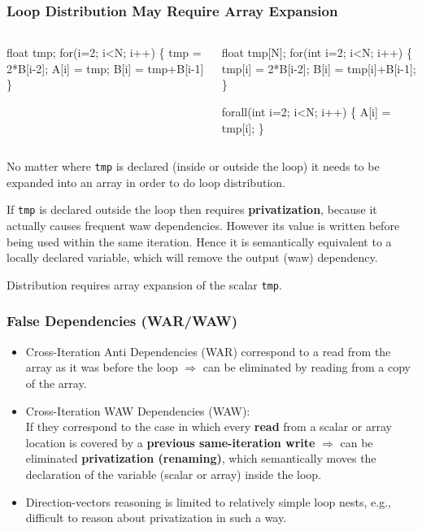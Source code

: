 \documentclass{beamer}
\renewcommand{\emph}[1]{\textcolor{structure}{#1}}
\newcommand{\emp}[1]{\textcolor{DikuRed}{ #1}}
\begin{document}
\begin{frame}[fragile,t]
  \frametitle{Loop Distribution May Require Array Expansion} 


\begin{columns}
\begin{colorcode}[fontsize=\scriptsize]
  float tmp;
  for(i=2; i<N; i++) \{
    \emp{tmp} = 2*B[i-2]; 
    A[i] = tmp;
    B[i] = tmp+B[i-1]
  \}
\end{colorcode}
\begin{colorcode}[fontsize=\scriptsize]
  \emph{float tmp[N]};
  for(int i=2; i<N; i++) \{
    tmp[i] = 2*B[i-2]; 
    B[i] = tmp[i]+B[i-1];
  \}

  \emph{forall(int i=2; i<N; i++)} \{
    A[i] = tmp[i];
  \}
\end{colorcode}
\end{columns}
\bigskip

No matter where {\tt tmp} is declared (inside or outside
the loop) it needs to be expanded into an array in order
to do loop distribution.\bigskip

If {\tt tmp} is declared outside the loop then requires \emp{\bf privatization}, \pause
because it actually causes frequent {\sc waw} dependencies.
However its value is written before being used within the same iteration.
Hence it is semantically equivalent to a locally declared variable,
which will remove the output ({\sc waw}) dependency.\bigskip

Distribution requires array expansion of the scalar {\tt tmp}.

\end{frame}


\begin{frame}[fragile,t]
  \frametitle{False Dependencies (WAR/WAW)} 

\begin{itemize}
    \item \emp{Cross-Iteration Anti Dependencies (WAR)} 
        correspond to a read from the array as it was 
        before the loop $\Rightarrow$ can be eliminated
        by reading from a copy of the array.\bigskip

    \item \emp{Cross-Iteration WAW Dependencies (WAW)}:\\
        If they correspond to the case in which every \emp{\bf read} from
        a scalar or array location is covered by a \emp{\bf previous same-iteration write}
        $\Rightarrow$ can be eliminated \emph{\bf privatization (renaming)},
        which semantically moves the declaration of the variable (scalar or array) 
        inside the loop.\bigskip

    \item Direction-vectors reasoning is limited to relatively
        simple loop nests, e.g., difficult to reason about 
        privatization in such a way.
\end  {itemize}
\end{frame}
\end{document}
